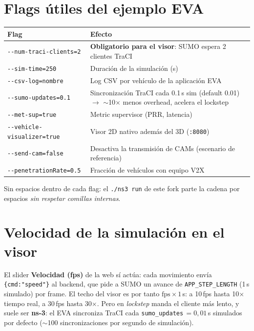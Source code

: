 \documentclass[11pt,a4paper]{article}
\begin{document}
\section{Flags útiles del ejemplo EVA}

\begin{center}
\small
\begin{tabular}{@{}p{}p{}@{}}
\toprule
\textbf{Flag} & \textbf{Efecto} \\
\midrule
\texttt{-{}-num-traci-clients=2} & \textbf{Obligatorio para el visor}: SUMO espera 2 clientes TraCI \\
\texttt{-{}-sim-time=250} & Duración de la simulación (s) \\
\texttt{-{}-csv-log=nombre} & Log CSV por vehículo de la aplicación EVA \\
\texttt{-{}-sumo-updates=0.1} & Sincronización TraCI cada 0.1\,s sim (default 0.01) $\rightarrow$ $\sim$10$\times$ menos overhead, acelera el lockstep \\
\texttt{-{}-met-sup=true} & Metric supervisor (PRR, latencia) \\
\texttt{-{}-vehicle-visualizer=true} & Visor 2D nativo además del 3D (\texttt{:8080}) \\
\texttt{-{}-send-cam=false} & Desactiva la transmisión de CAMs (escenario de referencia) \\
\texttt{-{}-penetrationRate=0.5} & Fracción de vehículos con equipo V2X \\
\bottomrule
\end{tabular}
\end{center}

\begin{advertenciabox}
Sin espacios dentro de cada flag: el \texttt{./ns3 run} de este fork parte la
cadena por espacios \emph{sin respetar comillas internas}.
\end{advertenciabox}

\section{Velocidad de la simulación en el visor}

El slider \textbf{Velocidad (fps)} de la web sí actúa: cada movimiento envía
\texttt{\{cmd:"speed"\}} al backend, que pide a SUMO un avance de
\texttt{APP\_STEP\_LENGTH} (1\,s simulado) por frame. El techo del visor es por
tanto $\text{fps}\times 1$\,s: a 10\,fps hasta 10$\times$ tiempo real, a
30\,fps hasta 30$\times$. Pero en \emph{lockstep} manda el cliente más lento,
y suele ser \textbf{ns-3}: el EVA sincroniza TraCI cada
\texttt{sumo\_updates}\,$=0{,}01$\,s simulados por defecto
($\sim$100 sincronizaciones por segundo de simulación).
\end{document}
